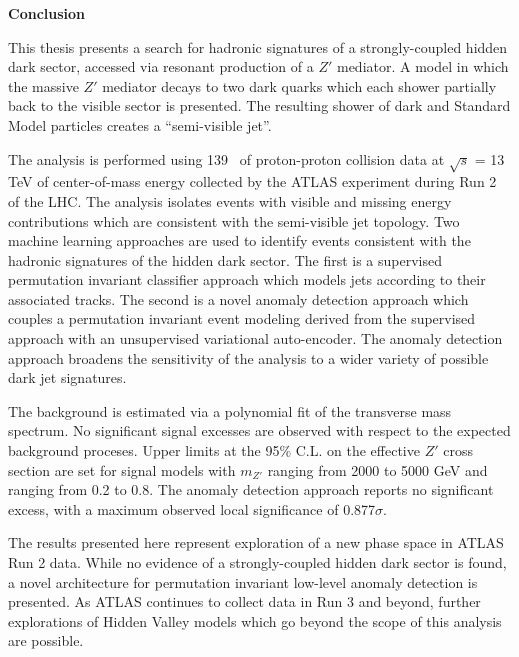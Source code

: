 
\begin{center}
\pagebreak
\vspace*{1\baselineskip}
\textbf{\large Conclusion}
\end{center}


This thesis presents a search for hadronic signatures of a strongly-coupled hidden dark sector, accessed via resonant production of a $Z'$ mediator. A model in which the massive $Z'$ mediator decays to two dark quarks which each shower partially back to the visible sector is presented. The resulting shower of dark and Standard Model particles creates a ``semi-visible jet''.\par

The analysis is performed using 139 \fb~of proton-proton collision data at $\sqrt{s}$ = 13 TeV of center-of-mass energy collected by the ATLAS experiment during Run 2 of the LHC. The analysis isolates events with visible and missing energy contributions which are consistent with the semi-visible jet topology. Two machine learning approaches are used to identify events consistent with the hadronic signatures of the hidden dark sector. The first is a supervised permutation invariant classifier approach which models jets according to their associated tracks. The second is a novel anomaly detection approach which couples a permutation invariant event modeling derived from the supervised approach with an unsupervised variational auto-encoder. The anomaly detection approach broadens the sensitivity of the analysis to a wider variety of possible dark jet signatures.\par

The background is estimated via a polynomial fit of the transverse mass spectrum. No significant signal excesses are observed with respect to the expected background proceses. Upper limits at the 95\% C.L. on the effective $Z'$ cross section are set for signal models with $m_{Z'}$ ranging from 2000 to 5000 GeV and \rinv~ ranging from 0.2 to 0.8. The anomaly detection approach reports no significant excess, with a maximum observed local significance of 0.877$\sigma$. \par

The results presented here represent exploration of a new phase space in ATLAS Run 2 data. While no evidence of a strongly-coupled hidden dark sector is found, a novel architecture for permutation invariant low-level anomaly detection is presented. As ATLAS continues to collect data in Run 3 and beyond, further explorations of Hidden Valley models which go beyond the scope of this analysis are possible.




